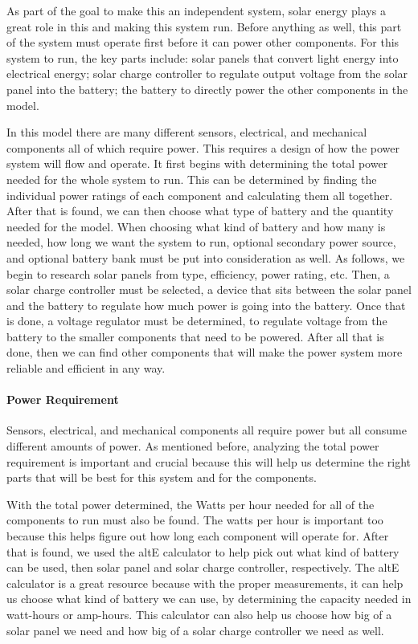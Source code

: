 As part of the goal to make this an independent system, solar energy plays a great role in this and making this system run. Before anything as well, this part of the system must operate first before it can power other components. For this system to run, the key parts include: solar panels that convert light energy into electrical energy; solar charge controller to regulate output voltage from the solar panel into the battery; the battery to directly power the other components in the model.

In this model there are many different sensors, electrical, and mechanical components all of which require power. This requires a design of how the power system will flow and operate. It first begins with determining the total power needed for the whole system to run. This can be determined by finding the individual power ratings of each component and calculating them all together. After that is found, we can then choose what type of battery and the quantity needed for the model. When choosing what kind of battery and how many is needed, how long we want the system to run, optional secondary power source, and optional battery bank must be put into consideration as well. As follows, we begin to research solar panels from type, efficiency, power rating, etc. Then, a solar charge controller must be selected, a device that sits between the solar panel and the battery to regulate how much power is going into the battery. Once that is done, a voltage regulator must be determined, to regulate voltage from the battery to the smaller components that need to be powered. After all that is done, then we can find other components that will make the power system more reliable and efficient in any way.

\paragraph{Power Requirement}
Sensors, electrical, and mechanical components all require power but all consume different amounts of power. As mentioned before, analyzing the total power requirement is important and crucial because this will help us determine the right parts that will be best for this system and for the components.

With the total power determined, the Watts per hour needed for all of the components to run must also be found. The watts per hour is important too because this helps figure out how long each component will operate for. After that is found, we used the altE calculator to help pick out what kind of battery can be used, then solar panel and solar charge controller, respectively. The altE calculator is a great resource because with the proper measurements, it can help us choose what kind of battery we can use, by determining the capacity needed in watt-hours or amp-hours. This calculator can also help us choose how big of a solar panel we need and how big of a solar charge controller we need as well.
